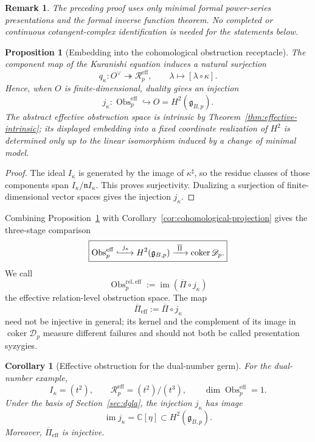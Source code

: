 \documentclass[11pt]{amsart}
\newtheorem{proposition}[theorem]{Proposition}
\newtheorem{corollary}[theorem]{Corollary}
\newtheorem{remark}[theorem]{Remark}
\newcommand{\coker}{\operatorname{coker}}
\newcommand{\Obs}{\operatorname{Obs}}
\newcommand{\cD}{\mathscr D}
\newcommand{\C}{\mathbb C}
\newcommand{\ghoch}{\mathfrak g}
\begin{document}
\begin{remark}
The preceding proof uses only minimal formal power-series presentations
and the formal inverse function theorem. No completed or continuous
cotangent-complex identification is needed for the statements below.
\end{remark}

\begin{proposition}[Embedding into the cohomological obstruction receptacle]\label{prop:effective-into-h2}
The component map of the Kuranishi equation induces a natural surjection
\[
q_\kappa:O^\vee\twoheadrightarrow\mathscr R^{\mathrm{eff}}_p,
\qquad
\lambda\longmapsto[\lambda\circ\kappa].
\]
Hence, when $O$ is finite-dimensional, duality gives an injection
\[
j_\kappa:\Obs^{\mathrm{eff}}_p\hookrightarrow O=H^2(\ghoch_{B,p}).
\]
The abstract effective obstruction space is intrinsic by Theorem~\ref{thm:effective-intrinsic}; its displayed embedding into a fixed coordinate realization of $H^2$ is determined only up to the linear isomorphism induced by a change of minimal model.
\end{proposition}

\begin{proof}
The ideal $I_\kappa$ is generated by the image of $\kappa^\sharp$, so the residue classes of those components span $I_\kappa/\mathfrak nI_\kappa$.  This proves surjectivity.  Dualizing a surjection of finite-dimensional vector spaces gives the injection $j_\kappa$.
\end{proof}

Combining Proposition~\ref{prop:effective-into-h2} with Corollary~\ref{cor:cohomological-projection} gives the three-stage comparison
\[
\boxed{
\Obs^{\mathrm{eff}}_p
\xhookrightarrow{\ j_\kappa\ }
H^2(\ghoch_{B,p})
\xrightarrow{\ \overline\Pi\ }
\coker\cD_p.
}
\]
We call
\[
\Obs^{\mathrm{rel,eff}}_p
:=
\operatorname{im}(\overline\Pi\circ j_\kappa)
\]
the effective relation-level obstruction space.  The map
\[
\overline\Pi_{\mathrm{eff}}
:=
\overline\Pi\circ j_\kappa
\]
need not be injective in general; its kernel and the complement of its image in $\coker\cD_p$ measure different failures and should not both be called presentation syzygies.

\begin{corollary}[Effective obstruction for the dual-number germ]\label{cor:dual-effective}
For the dual-number example,
\[
I_\kappa=(t^2),
\qquad
\mathscr R^{\mathrm{eff}}_p
=(t^2)/(t^3),
\qquad
\dim\Obs^{\mathrm{eff}}_p=1.
\]
Under the basis of Section~\ref{sec:dgla}, the injection $j_\kappa$ has image
\[
\operatorname{im}j_\kappa=\C[\eta]\subset H^2(\ghoch_{B,p}).
\]
Moreover, $\overline\Pi_{\mathrm{eff}}$ is injective.
\end{corollary}
\end{document}
